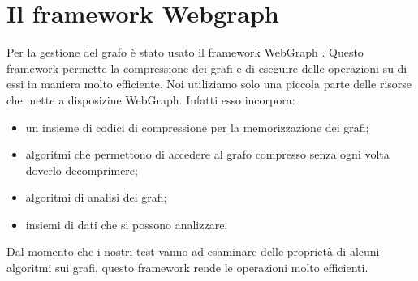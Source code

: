 \section{Il framework Webgraph}
Per la gestione del grafo è stato usato il framework WebGraph \cite{Boldi03thewebgraph}. Questo framework permette la compressione dei grafi e di eseguire delle operazioni su di essi in maniera molto efficiente. Noi utiliziamo solo una piccola parte delle risorse che mette a disposizine WebGraph. Infatti esso incorpora:
\begin{itemize}
 \item un insieme di codici di compressione per la memorizzazione dei grafi;
 \item algoritmi che permettono di accedere al grafo compresso senza ogni volta doverlo decomprimere;
 \item algoritmi di analisi dei grafi;
 \item insiemi di dati che si possono analizzare.
\end{itemize}
Dal momento che i nostri test vanno ad esaminare delle proprietà di alcuni algoritmi sui grafi, questo framework rende le operazioni molto efficienti.

